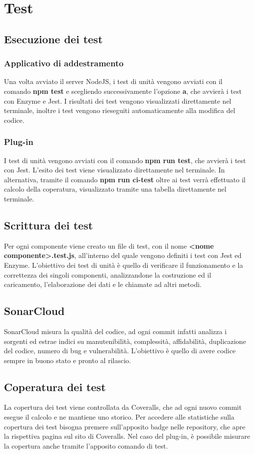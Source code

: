 \section{Test}
	\subsection{Esecuzione dei test}
		\subsubsection{Applicativo di addestramento}
			Una volta avviato il server NodeJS, i test di unità vengono avviati con il comando \textbf{npm test} e scegliendo successivamente l'opzione \textbf{a}, che avvierà i test con Enzyme e Jest. I risultati dei test vengono visualizzati direttamente nel terminale, inoltre i test vengono rieseguiti automaticamente alla modifica del codice.
		\subsubsection{Plug-in}
			I test di unità vengono avviati con il comando \textbf{npm run test}, che avvierà i test con Jest. L'esito dei test viene visualizzato direttamente nel terminale. In alternativa, tramite il comando \textbf{npm run ci-test} oltre ai test verrà effettuato il calcolo della coperatura, visualizzato tramite una tabella direttamente nel terminale.
	\subsection{Scrittura dei test}
		Per ogni componente viene creato un file di test, con il nome \textbf{<nome componente>.test.js}, all'interno del quale vengono definiti i test con Jest ed Enzyme.	L'obiettivo dei test di unità è quello di verificare il funzionamento e la correttezza dei singoli componenti, 
		analizzandone la costruzione ed il caricamento, l'elaborazione dei dati e le chiamate ad altri metodi.
	\subsection{SonarCloud}
		SonarCloud misura la qualità del codice, ad ogni commit infatti analizza i sorgenti ed estrae indici su manutenibilità, complessità, affidabilità, duplicazione del codice, numero di bug e vulnerabilità. L'obiettivo è quello di avere codice sempre in buono stato e pronto al rilascio.
	\subsection{Coperatura dei test}
		La copertura dei test viene controllata da Coveralls, che ad ogni nuovo commit esegue il calcolo e ne mantiene uno storico. Per accedere alle statistiche sulla copertura dei test bisogna premere sull'apposito badge nelle repository\glo, che apre la rispettiva pagina sul sito di Coveralls. Nel caso del plug-in, è possibile misurare la copertura anche tramite l'apposito comando di test.
